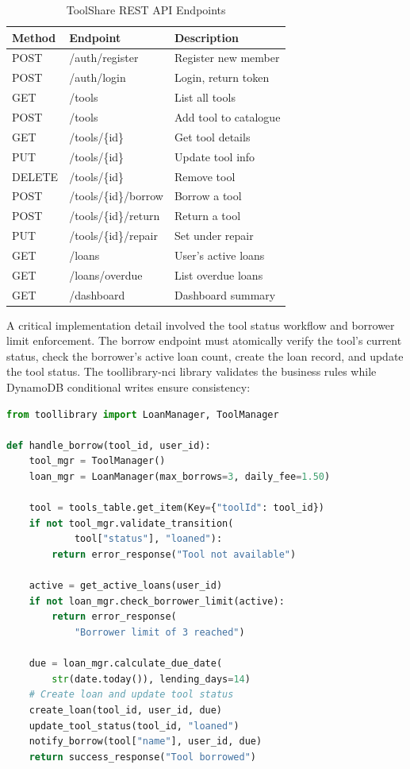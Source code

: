\documentclass[conference]{IEEEtran}
\begin{document}
\begin{table}[H]
\centering
\caption{ToolShare REST API Endpoints}
\label{tab:endpoints}
\begin{tabular}{|l|l|l|}
\hline
\textbf{Method} & \textbf{Endpoint} & \textbf{Description} \\
\hline
POST & /auth/register & Register new member \\
POST & /auth/login & Login, return token \\
\hline
GET & /tools & List all tools \\
POST & /tools & Add tool to catalogue \\
GET & /tools/\{id\} & Get tool details \\
PUT & /tools/\{id\} & Update tool info \\
DELETE & /tools/\{id\} & Remove tool \\
\hline
POST & /tools/\{id\}/borrow & Borrow a tool \\
POST & /tools/\{id\}/return & Return a tool \\
PUT & /tools/\{id\}/repair & Set under repair \\
\hline
GET & /loans & User's active loans \\
GET & /loans/overdue & List overdue loans \\
GET & /dashboard & Dashboard summary \\
\hline
\end{tabular}
\end{table}

A critical implementation detail involved the tool status workflow and borrower limit enforcement. The borrow endpoint must atomically verify the tool's current status, check the borrower's active loan count, create the loan record, and update the tool status. The toollibrary-nci library validates the business rules while DynamoDB conditional writes ensure consistency:

\begin{lstlisting}[language=Python, caption={Borrow request processing with limit enforcement}]
from toollibrary import LoanManager, ToolManager

def handle_borrow(tool_id, user_id):
    tool_mgr = ToolManager()
    loan_mgr = LoanManager(max_borrows=3, daily_fee=1.50)

    tool = tools_table.get_item(Key={"toolId": tool_id})
    if not tool_mgr.validate_transition(
            tool["status"], "loaned"):
        return error_response("Tool not available")

    active = get_active_loans(user_id)
    if not loan_mgr.check_borrower_limit(active):
        return error_response(
            "Borrower limit of 3 reached")

    due = loan_mgr.calculate_due_date(
        str(date.today()), lending_days=14)
    # Create loan and update tool status
    create_loan(tool_id, user_id, due)
    update_tool_status(tool_id, "loaned")
    notify_borrow(tool["name"], user_id, due)
    return success_response("Tool borrowed")
\end{lstlisting}
\end{document}
